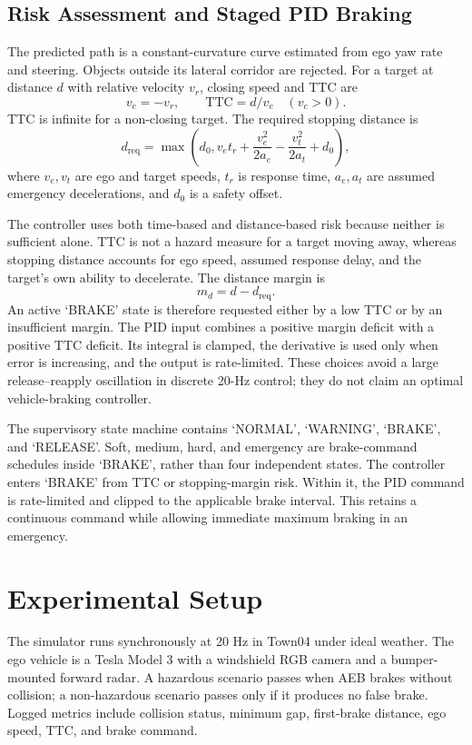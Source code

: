 \documentclass[conference]{IEEEtran}
\begin{document}
\subsection{Risk Assessment and Staged PID Braking}
The predicted path is a constant-curvature curve estimated from ego yaw rate and
steering. Objects outside its lateral corridor are rejected. For a target at
distance $d$ with relative velocity $v_r$, closing speed and TTC are
\begin{equation}
 v_c=-v_r,\qquad \mathrm{TTC}=d/v_c \quad (v_c>0).
 \label{eq:ttc}
\end{equation}
TTC is infinite for a non-closing target. The required stopping distance is
\begin{equation}
 d_\mathrm{req}=\max\left(d_0,v_e t_r+\frac{v_e^2}{2a_e}
 -\frac{v_t^2}{2a_t}+d_0\right),
 \label{eq:stopping}
\end{equation}
where $v_e,v_t$ are ego and target speeds, $t_r$ is response time, $a_e,a_t$
are assumed emergency decelerations, and $d_0$ is a safety offset.

The controller uses both time-based and distance-based risk because neither is
sufficient alone. TTC is not a hazard measure for a target moving away, whereas
stopping distance accounts for ego speed, assumed response delay, and the
target's own ability to decelerate. The distance margin is
\begin{equation}
m_d=d-d_\mathrm{req}.
\label{eq:margin}
\end{equation}
An active `BRAKE' state is therefore requested either by a low TTC or by an
insufficient margin. The PID input combines a positive margin deficit with a
positive TTC deficit. Its integral is clamped, the derivative is used only when
error is increasing, and the output is rate-limited. These choices avoid a large
release--reapply oscillation in discrete 20-Hz control; they do not claim an
optimal vehicle-braking controller.

The supervisory state machine contains `NORMAL', `WARNING', `BRAKE', and
`RELEASE'. Soft, medium, hard, and emergency are brake-command schedules inside
`BRAKE', rather than four independent states. The controller enters `BRAKE' from
TTC or stopping-margin risk. Within it, the PID command is rate-limited and
clipped to the applicable brake interval. This retains a continuous command
while allowing immediate maximum braking in an emergency.

\section{Experimental Setup}
The simulator runs synchronously at 20 Hz in Town04 under ideal weather. The ego
vehicle is a Tesla Model 3 with a windshield RGB camera and a bumper-mounted
forward radar. A hazardous scenario passes when AEB brakes without collision;
a non-hazardous scenario passes only if it produces no false brake. Logged
metrics include collision status, minimum gap, first-brake distance, ego speed,
TTC, and brake command.
\end{document}
